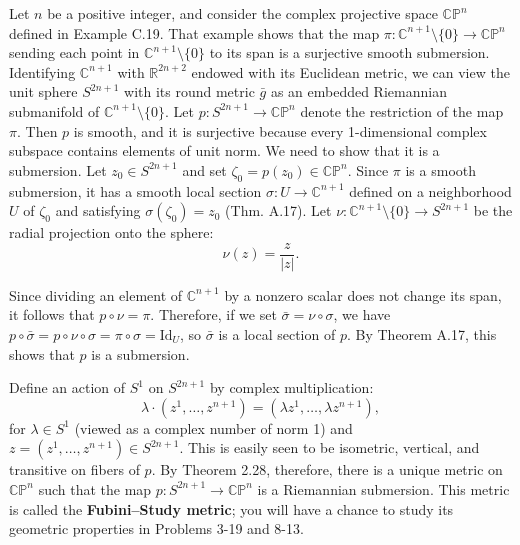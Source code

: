 \begin{example}
\label{ex:fubini-study-metric}

Let $n$ be a positive integer, and consider the complex projective space $\mathbb{CP}^n$ defined in Example C.19. That example shows that the map $\pi : \mathbb{C}^{n+1} \setminus \{0\} \to \mathbb{CP}^n$ sending each point in $\mathbb{C}^{n+1} \setminus \{0\}$ to its span is a surjective smooth submersion. Identifying $\mathbb{C}^{n+1}$ with $\mathbb{R}^{2n+2}$ endowed with its Euclidean metric, we can view the unit sphere $S^{2n+1}$ with its round metric $\bar{g}$ as an embedded Riemannian submanifold of $\mathbb{C}^{n+1} \setminus \{0\}$. Let $p: S^{2n+1} \to \mathbb{CP}^n$ denote the restriction of the map $\pi$. Then $p$ is smooth, and it is surjective because every 1-dimensional complex subspace contains elements of unit norm. We need to show that it is a submersion. Let $z_0 \in S^{2n+1}$ and set $\zeta_0 = p(z_0) \in \mathbb{CP}^n$. Since $\pi$ is a smooth submersion, it has a smooth local section $\sigma : U \to \mathbb{C}^{n+1}$ defined on a neighborhood $U$ of $\zeta_0$ and satisfying $\sigma(\zeta_0) = z_0$ (Thm. A.17). Let $\nu: \mathbb{C}^{n+1} \setminus \{0\} \to S^{2n+1}$ be the radial projection onto the sphere:
\[
\nu(z) = \frac{z}{|z|}.
\]

Since dividing an element of $\mathbb{C}^{n+1}$ by a nonzero scalar does not change its span, it follows that $p \circ \nu = \pi$. Therefore, if we set $\bar{\sigma} = \nu \circ \sigma$, we have $p \circ \bar{\sigma} = p \circ \nu \circ \sigma = \pi \circ \sigma = \text{Id}_U$, so $\bar{\sigma}$ is a local section of $p$. By Theorem A.17, this shows that $p$ is a submersion.

Define an action of $S^1$ on $S^{2n+1}$ by complex multiplication:
\[
\lambda \cdot (z^1,\ldots,z^{n+1}) = (\lambda z^1,\ldots,\lambda z^{n+1}),
\]
for $\lambda \in S^1$ (viewed as a complex number of norm 1) and $z = (z^1,\ldots,z^{n+1}) \in S^{2n+1}$. This is easily seen to be isometric, vertical, and transitive on fibers of $p$. By Theorem 2.28, therefore, there is a unique metric on $\mathbb{CP}^n$ such that the map $p: S^{2n+1} \to \mathbb{CP}^n$ is a Riemannian submersion. This metric is called the \textbf{Fubini--Study metric}; you will have a chance to study its geometric properties in Problems 3-19 and 8-13.
\end{example}

